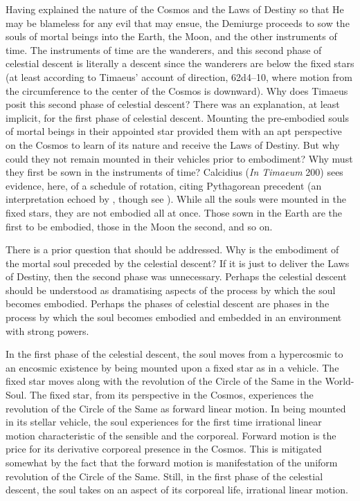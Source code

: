 Having explained the nature of the Cosmos and the Laws of Destiny so that He may be blameless for any evil that may ensue, the Demiurge proceeds to sow the souls of mortal beings into the Earth, the Moon, and the other instruments of time. The instruments of time are the wanderers, and this second phase of celestial descent is literally a descent since the wanderers are below the fixed stars (at least according to Timaeus' account of direction, 62d4--10, where motion from the circumference to the center of the Cosmos is downward). Why does Timaeus posit this second phase of celestial descent? There was an explanation, at least implicit, for the first phase of celestial descent. Mounting the pre-embodied souls of mortal beings in their appointed star provided them with an apt perspective on the Cosmos to learn of its nature and receive the Laws of Destiny. But why could they not remain mounted in their vehicles prior to embodiment? Why must they first be sown in the instruments of time? Calcidius (\emph{In Timaeum} 200) sees evidence, here, of a schedule of rotation, citing Pythagorean precedent (an interpretation echoed by \citealt[146]{Cornford:1935fk}, though see \citealt[258--9]{Taylor:1928qb}). While all the souls were mounted in the fixed stars, they are not embodied all at once. Those sown in the Earth are the first to be embodied, those in the Moon the second, and so on. 

There is a prior question that should be addressed. Why is the embodiment of the mortal soul preceded by the celestial descent? If it is just to deliver the Laws of Destiny, then the second phase was unnecessary. Perhaps the celestial descent should be understood as dramatising aspects of the process by which the soul becomes embodied. Perhaps the phases of celestial descent are phases in the process by which the soul becomes embodied and embedded in an environment with strong powers. 

In the first phase of the celestial descent, the soul moves from a hypercosmic to an encosmic existence by being mounted upon a fixed star as in a vehicle. The fixed star moves along with the revolution of the Circle of the Same in the World-Soul. The fixed star, from its perspective in the Cosmos, experiences the revolution of the Circle of the Same as forward linear motion. In being mounted in its stellar vehicle, the soul experiences for the first time irrational linear motion characteristic of the sensible and the corporeal. Forward motion is the price for its derivative corporeal presence in the Cosmos. This is mitigated somewhat by the fact that the forward motion is manifestation of the uniform revolution of the Circle of the Same. Still, in the first phase of the celestial descent, the soul takes on an aspect of its corporeal life, irrational linear motion. 

